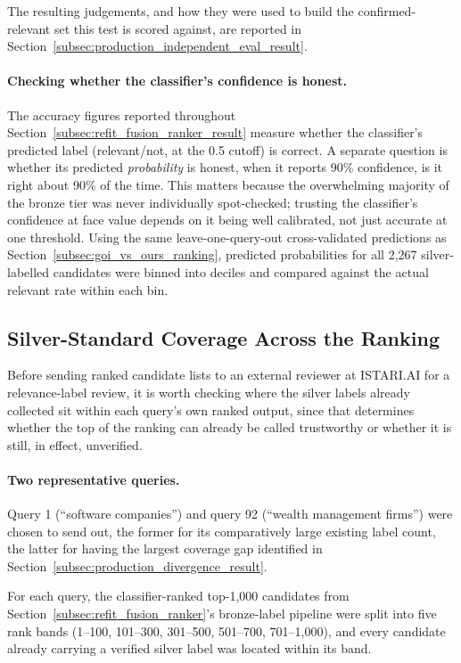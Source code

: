 \documentclass[a4paper,oneside,bibliography=totoc]{scrbook}
\begin{document}
The resulting judgements, and how they were used to build the confirmed-relevant set this test is scored against, are reported in Section~\ref{subsec:production_independent_eval_result}.

\paragraph{Checking whether the classifier's confidence is honest.}
\label{subsec:calibration_check}

The accuracy figures reported throughout Section~\ref{subsec:refit_fusion_ranker_result} measure whether the classifier's predicted label (relevant/not, at the 0.5 cutoff) is correct. A separate question is whether its predicted \emph{probability} is honest, when it reports 90\% confidence, is it right about 90\% of the time. This matters because the overwhelming majority of the bronze tier was never individually spot-checked; trusting the classifier's confidence at face value depends on it being well calibrated, not just accurate at one threshold. Using the same leave-one-query-out cross-validated predictions as Section~\ref{subsec:goi_vs_ours_ranking}, predicted probabilities for all 2{,}267 silver-labelled candidates were binned into deciles and compared against the actual relevant rate within each bin.

\subsection{Silver-Standard Coverage Across the Ranking}
\label{subsec:external_review_prep}

Before sending ranked candidate lists to an external reviewer at ISTARI.AI for a relevance-label review, it is worth checking where the silver labels already collected sit within each query's own ranked output, since that determines whether the top of the ranking can already be called trustworthy or whether it is still, in effect, unverified.

\paragraph{Two representative queries.} Query 1 (``software companies'') and query 92 (``wealth management firms'') were chosen to send out, the former for its comparatively large existing label count, the latter for having the largest coverage gap identified in Section~\ref{subsec:production_divergence_result}.

For each query, the classifier-ranked top-1{,}000 candidates from Section~\ref{subsec:refit_fusion_ranker}'s bronze-label pipeline were split into five rank bands (1--100, 101--300, 301--500, 501--700, 701--1{,}000), and every candidate already carrying a verified silver label was located within its band.
\end{document}
